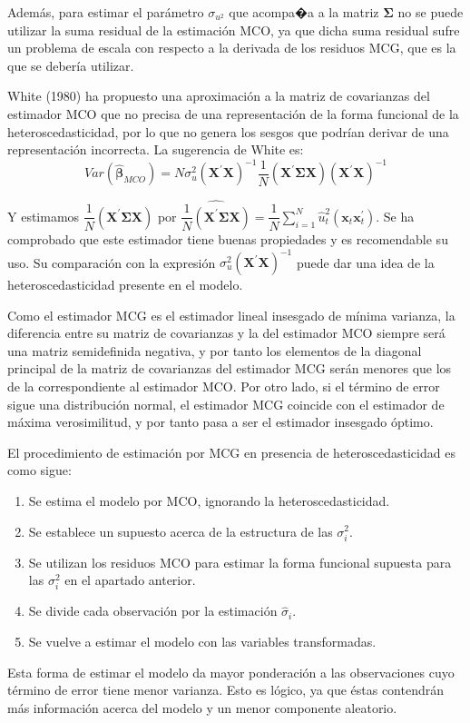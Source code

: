 Adem\'as, para estimar el par\'ametro $\sigma_{u^{2}}$ que acompa�a a
la matriz $\boldsymbol{\Sigma}$ no se puede utilizar la suma residual
de la estimaci\'on MCO, ya que dicha suma residual sufre un problema
de escala con respecto a la derivada de los residuos MCG, que es la
que se deber\'ia utilizar.

White (1980) ha propuesto una aproximaci\'on a la matriz de covarianzas
del estimador MCO que no precisa de una representaci\'on de la forma
funcional de la heteroscedasticidad, por lo que no genera los sesgos
que podr\'ian derivar de una representaci\'on incorrecta. La sugerencia
de White es: 
\[
Var\left(\hat{\boldsymbol{\beta}}_{MCO}\right)=N\sigma_{u}^{2}\left(\boldsymbol{X}^{\prime}\boldsymbol{X}\right)^{-1}\dfrac{1}{N}\left(\boldsymbol{X}^{\prime}\boldsymbol{\Sigma}\boldsymbol{X}\right)\left(\boldsymbol{X}^{\prime}\boldsymbol{X}\right)^{-1}
\]


Y estimamos $\dfrac{1}{N}\left(\boldsymbol{X}^{\prime}\boldsymbol{\Sigma}\boldsymbol{X}\right)$
por $\widehat{\dfrac{1}{N}\left(\boldsymbol{X}^{\prime}\boldsymbol{\Sigma}\boldsymbol{X}\right)}=\dfrac{1}{N}\sum_{i=1}^{N}\hat{u}_{t}^{2}\left(\boldsymbol{x}_{t}\boldsymbol{x}_{t}^{\prime}\right)$.
Se ha comprobado que este estimador tiene buenas propiedades y es
recomendable su uso. Su comparaci\'on con la expresi\'on $\sigma_{u}^{2}\left(\boldsymbol{X}^{\prime}\boldsymbol{X}\right)^{-1}$
puede dar una idea de la heteroscedasticidad presente en el modelo.

Como el estimador MCG es el estimador lineal insesgado de m\'inima varianza,
la diferencia entre su matriz de covarianzas y la del estimador MCO
siempre ser\'a una matriz semidefinida negativa, y por tanto los elementos
de la diagonal principal de la matriz de covarianzas del estimador
MCG ser\'an menores que los de la correspondiente al estimador MCO.
Por otro lado, si el t\'ermino de error sigue una distribuci\'on normal,
el estimador MCG coincide con el estimador de m\'axima verosimilitud,
y por tanto pasa a ser el estimador insesgado \'optimo.

El procedimiento de estimaci\'on por MCG en presencia de heteroscedasticidad
es como sigue:
\begin{enumerate}
\item Se estima el modelo por MCO, ignorando la heteroscedasticidad.
\item Se establece un supuesto acerca de la estructura de las $\sigma_{i}^{2}$.
\item Se utilizan los residuos MCO para estimar la forma funcional supuesta
para las $\sigma_{i}^{2}$ en el apartado anterior.
\item Se divide cada observaci\'on por la estimaci\'on $\hat{\sigma}_{i}$.
\item Se vuelve a estimar el modelo con las variables transformadas.
\end{enumerate}
Esta forma de estimar el modelo da mayor ponderaci\'on a las observaciones
cuyo t\'ermino de error tiene menor varianza. Esto es l\'ogico, ya que
\'estas contendr\'an m\'as informaci\'on acerca del modelo y un menor componente
aleatorio.


